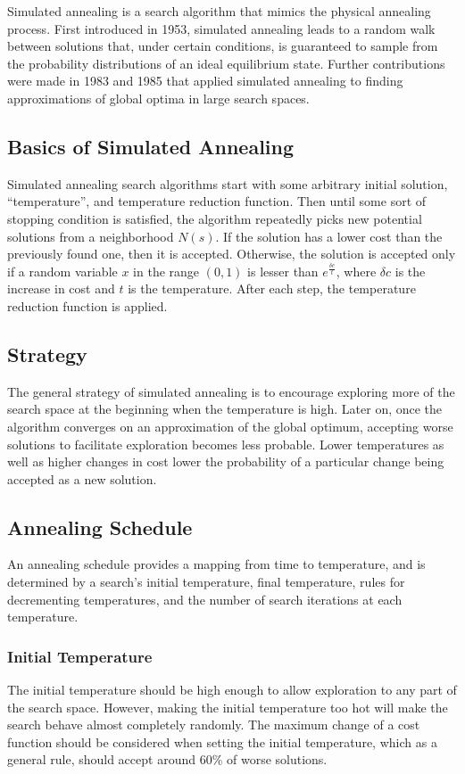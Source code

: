 \documentclass[12pt,titlepage]{article}
\begin{document}
      Simulated annealing is a search algorithm that mimics the physical annealing process. First introduced in 1953, simulated annealing leads to a random walk between
      solutions that, under certain conditions, is guaranteed to sample from the probability distributions of an ideal equilibrium state. Further contributions were made in 1983
      and 1985 that applied simulated annealing to finding approximations of global optima in large search spaces.

    \subsection{Basics of Simulated Annealing}
      Simulated annealing search algorithms start with some arbitrary initial solution, ``temperature'', and temperature reduction function. Then until some sort of stopping condition
      is satisfied, the algorithm repeatedly picks new potential solutions from a neighborhood $N(s)$. If the solution has a lower cost than the previously found one, then it is accepted.
      Otherwise, the solution is accepted only if a random variable $x$ in the range $(0, 1)$ is lesser than $e^{\frac{\delta c}{t}}$, where $\delta c$ is the increase in cost and $t$ is
      the temperature. After each step, the temperature reduction function is applied.

    \subsection{Strategy}
      The general strategy of simulated annealing is to encourage exploring more of the search space at the beginning when the temperature is high. Later on, once the algorithm converges
      on an approximation of the global optimum, accepting worse solutions to facilitate exploration becomes less probable. Lower temperatures as well as higher changes in cost lower the
      probability of a particular change being accepted as a new solution.

    \subsection{Annealing Schedule}
      An annealing schedule provides a mapping from time to temperature, and is determined by a search's initial temperature, final temperature, rules for decrementing temperatures, and the
      number of search iterations at each temperature.

      \subsubsection{Initial Temperature}
        The initial temperature should be high enough to allow exploration to any part of the search space. However, making the initial temperature too hot will make the search behave almost
        completely randomly. The maximum change of a cost function should be considered when setting the initial temperature, which as a general rule, should accept around 60\% of worse
        solutions.
\end{document}
